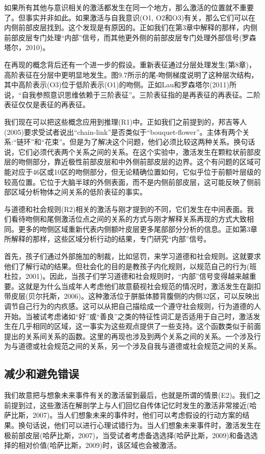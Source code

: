 如果所有其他与意识相关的激活都发生在同一个地方，那么激活的位置就不重要了。但事实并非如此。如果激活与自我意识(O1, O2和O3)有关，那么它们可以在内侧前部皮层找到。这个发现是有原因的。正如我们在第3章中解释的那样，内侧前部皮层专门处理“内部”信号，而其他更外侧的前部皮层专门处理外部信号(罗森塔尔，2010)。

在再现的概念背后还有一个进一步的假设。重新表征通过分层处理发生(第8章)，高阶表征在分层中更明显地发生。图9.7所示的尾-吻侧梯度说明了这种层次结构，其中高阶表示(O3)位于低阶表示(O1)的吻侧。正如Lau和罗森塔尔(2011)所说，“自我参照意识思维依赖于三阶表征”。三阶表征指的是再表征的再表征。二阶表征仅仅是表征的再表征。

我们现在可以把这些概念应用到推理(R1)中。正如我们之前提到的，邦吉等人(2005)要求受试者说出“chain-link”是否类似于“bouquet-flower”。主体有两个关系:“链环”和“花束”。但是为了解决这个问题，他们必须比较这两种关系。换句话说，它们必须代表两个关系之间的关系。在这个实验中，激活发生在颗粒状前部皮层的吻侧部分，靠近极性前部皮层和中外侧前部皮层的边界。这个有问题的区域可能对应于46区或10区的吻侧部分，但无论精确位置如何，它似乎位于前额叶层级的较高位置。它位于大脑半球的外侧表面，而不是内侧前部皮层，这可能反映了侧前部区域分析物体之间关系的低阶表征的事实。

与道德和社会规则(R2)相关的激活与刚才提到的不同，它们发生在中间表面。我们看待吻侧和尾侧激活位点之间的关系的方式与刚才解释关系再现的方式大致相同。更多的吻侧区域重新代表内侧额叶皮层更多尾部部分分析的信息。正如第3章所解释的那样，这些区域分析行动的结果，专门研究“内部”信号。

首先，孩子们通过外部施加的制裁，比如惩罚，来学习道德和社会规则。这就要求他们了解行动的结果。但社会化的目的是教孩子内化规则，以规范自己的行为(班杜拉，2001)。因此，当孩子们学习道德和社会规则时，“内部”信号变得越来越重要。这就是为什么当成年人考虑他们故意藐视社会规范的情况时，激活发生在副扣带皮层(贝尔托斯，2006)。这种激活位于胼胝体膝背腹侧的内侧32区，可以反映出调节自己行为的内疚感。这可以从把自己描绘成一个遵守社会规则，行为道德的人开始。当被试考虑诸如“好”或“善良”之类的特征性词汇是否适用于自己时，激活发生在几乎相同的区域，这一事实为这些观点提供了一些支持。这个函数类似于前面提出的关系间关系的函数。这里的再现也涉及到两个关系之间的关系。一个涉及行为与道德或社会规范之间的关系，另一个涉及自我与道德或社会规范之间的关系。

\subsection{减少和避免错误}

我们故意把与想象未来事件有关的激活留到最后，也就是所谓的情景(E2)。我们之前提到过，这些激活在解剖学上与人们回忆自传体记忆时发生的激活非常接近(哈萨比斯，2007)。当人们想象未来的事件时，他们可以考虑假设的行动方案的结果。换句话说，他们可以进行心理试错行为。当人们想象未来事件时，激活发生在极前部皮层(哈萨比斯，2007)，当受试者考虑备选选择(哈萨比斯，2009)和备选选择的相对价值(哈萨比斯，2009)时，该区域也会被激活。


